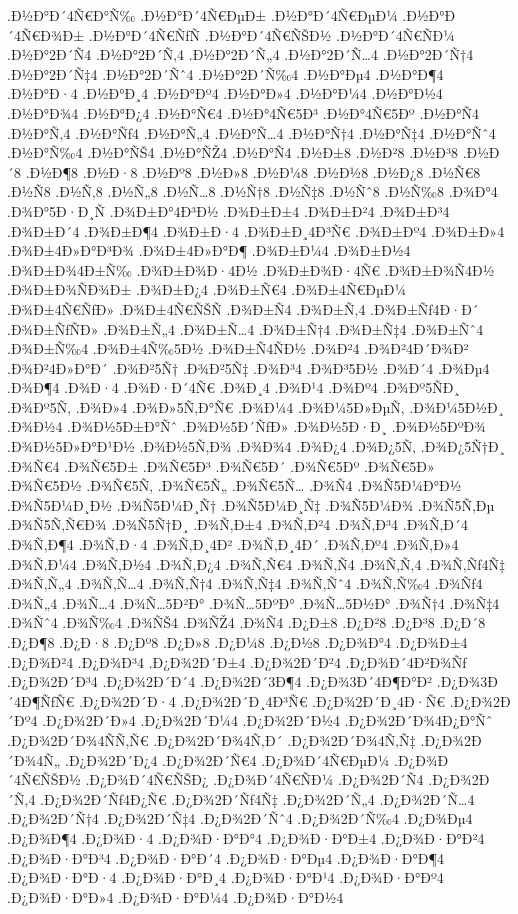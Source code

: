 {.Ð½Ð°Ð´4Ñ€Ð°Ñ‰
.Ð½Ð°Ð´4Ñ€ÐµÐ±
.Ð½Ð°Ð´4Ñ€ÐµÐ¼
.Ð½Ð°Ð´4Ñ€Ð¾Ð±
.Ð½Ð°Ð´4Ñ€ÑƒÑ
.Ð½Ð°Ð´4Ñ€ÑŠÐ½
.Ð½Ð°Ð´4Ñ€ÑÐ¼
.Ð½Ð°2Ð´Ñ4
.Ð½Ð°2Ð´Ñ‚4
.Ð½Ð°2Ð´Ñ„4
.Ð½Ð°2Ð´Ñ…4
.Ð½Ð°2Ð´Ñ†4
.Ð½Ð°2Ð´Ñ‡4
.Ð½Ð°2Ð´Ñˆ4
.Ð½Ð°2Ð´Ñ‰4
.Ð½Ð°Ðµ4
.Ð½Ð°Ð¶4
.Ð½Ð°Ð·4
.Ð½Ð°Ð¸4
.Ð½Ð°Ðº4
.Ð½Ð°Ð»4
.Ð½Ð°Ð¼4
.Ð½Ð°Ð½4
.Ð½Ð°Ð¾4
.Ð½Ð°Ð¿4
.Ð½Ð°Ñ€4
.Ð½Ð°4Ñ€5Ð³
.Ð½Ð°4Ñ€5Ðº
.Ð½Ð°Ñ4
.Ð½Ð°Ñ‚4
.Ð½Ð°Ñƒ4
.Ð½Ð°Ñ„4
.Ð½Ð°Ñ…4
.Ð½Ð°Ñ†4
.Ð½Ð°Ñ‡4
.Ð½Ð°Ñˆ4
.Ð½Ð°Ñ‰4
.Ð½Ð°ÑŠ4
.Ð½Ð°ÑŽ4
.Ð½Ð°Ñ4
.Ð½Ð±8
.Ð½Ð²8
.Ð½Ð³8
.Ð½Ð´8
.Ð½Ð¶8
.Ð½Ð·8
.Ð½Ðº8
.Ð½Ð»8
.Ð½Ð¼8
.Ð½Ð½8
.Ð½Ð¿8
.Ð½Ñ€8
.Ð½Ñ8
.Ð½Ñ‚8
.Ð½Ñ„8
.Ð½Ñ…8
.Ð½Ñ†8
.Ð½Ñ‡8
.Ð½Ñˆ8
.Ð½Ñ‰8
.Ð¾Ð°4
.Ð¾Ð°5Ð·Ð¸Ñ
.Ð¾Ð±Ð°4Ð³Ð½
.Ð¾Ð±Ð±4
.Ð¾Ð±Ð²4
.Ð¾Ð±Ð³4
.Ð¾Ð±Ð´4
.Ð¾Ð±Ð¶4
.Ð¾Ð±Ð·4
.Ð¾Ð±Ð¸4Ð³Ñ€
.Ð¾Ð±Ðº4
.Ð¾Ð±Ð»4
.Ð¾Ð±4Ð»Ð°Ð³Ð¾
.Ð¾Ð±4Ð»Ð°Ð¶
.Ð¾Ð±Ð¼4
.Ð¾Ð±Ð½4
.Ð¾Ð±Ð¾4Ð±Ñ‰
.Ð¾Ð±Ð¾Ð·4Ð½
.Ð¾Ð±Ð¾Ð·4Ñ€
.Ð¾Ð±Ð¾Ñ4Ð½
.Ð¾Ð±Ð¾ÑÐ¾Ð±
.Ð¾Ð±Ð¿4
.Ð¾Ð±Ñ€4
.Ð¾Ð±4Ñ€ÐµÐ¼
.Ð¾Ð±4Ñ€ÑƒÐ»
.Ð¾Ð±4Ñ€ÑŠÑ
.Ð¾Ð±Ñ4
.Ð¾Ð±Ñ‚4
.Ð¾Ð±Ñƒ4Ð·Ð´
.Ð¾Ð±ÑƒÑÐ»
.Ð¾Ð±Ñ„4
.Ð¾Ð±Ñ…4
.Ð¾Ð±Ñ†4
.Ð¾Ð±Ñ‡4
.Ð¾Ð±Ñˆ4
.Ð¾Ð±Ñ‰4
.Ð¾Ð±4Ñ‰5Ð½
.Ð¾Ð±Ñ4ÑÐ½
.Ð¾Ð²4
.Ð¾Ð²4Ð´Ð¾Ð²
.Ð¾Ð²4Ð»Ð°Ð´
.Ð¾Ð²5Ñ†
.Ð¾Ð²5Ñ‡
.Ð¾Ð³4
.Ð¾Ð³5Ð½
.Ð¾Ð´4
.Ð¾Ðµ4
.Ð¾Ð¶4
.Ð¾Ð·4
.Ð¾Ð·Ð´4Ñ€
.Ð¾Ð¸4
.Ð¾Ð¹4
.Ð¾Ðº4
.Ð¾Ðº5ÑÐ¸
.Ð¾Ðº5Ñ‚
.Ð¾Ð»4
.Ð¾Ð»5Ñ‚Ð°Ñ€
.Ð¾Ð¼4
.Ð¾Ð¼5Ð»ÐµÑ‚
.Ð¾Ð¼5Ð½Ð¸
.Ð¾Ð½4
.Ð¾Ð½5Ð±Ð°Ñˆ
.Ð¾Ð½5Ð´ÑƒÐ»
.Ð¾Ð½5Ð·Ð¸
.Ð¾Ð½5ÐºÐ¾
.Ð¾Ð½5Ð»Ð°Ð¹Ð½
.Ð¾Ð½5Ñ‚Ð¾
.Ð¾Ð¾4
.Ð¾Ð¿4
.Ð¾Ð¿5Ñ‚
.Ð¾Ð¿5Ñ†Ð¸
.Ð¾Ñ€4
.Ð¾Ñ€5Ð±
.Ð¾Ñ€5Ð³
.Ð¾Ñ€5Ð´
.Ð¾Ñ€5Ðº
.Ð¾Ñ€5Ð»
.Ð¾Ñ€5Ð½
.Ð¾Ñ€5Ñ‚
.Ð¾Ñ€5Ñ„
.Ð¾Ñ€5Ñ…
.Ð¾Ñ4
.Ð¾Ñ5Ð¼Ð°Ð½
.Ð¾Ñ5Ð¼Ð¸Ð½
.Ð¾Ñ5Ð¼Ð¸Ñ†
.Ð¾Ñ5Ð¼Ð¸Ñ‡
.Ð¾Ñ5Ð¼Ð¾
.Ð¾Ñ5Ñ‚Ðµ
.Ð¾Ñ5Ñ‚Ñ€Ð¾
.Ð¾Ñ5Ñ†Ð¸
.Ð¾Ñ‚Ð±4
.Ð¾Ñ‚Ð²4
.Ð¾Ñ‚Ð³4
.Ð¾Ñ‚Ð´4
.Ð¾Ñ‚Ð¶4
.Ð¾Ñ‚Ð·4
.Ð¾Ñ‚Ð¸4Ð²
.Ð¾Ñ‚Ð¸4Ð´
.Ð¾Ñ‚Ðº4
.Ð¾Ñ‚Ð»4
.Ð¾Ñ‚Ð¼4
.Ð¾Ñ‚Ð½4
.Ð¾Ñ‚Ð¿4
.Ð¾Ñ‚Ñ€4
.Ð¾Ñ‚Ñ4
.Ð¾Ñ‚Ñ‚4
.Ð¾Ñ‚Ñƒ4Ñ‡
.Ð¾Ñ‚Ñ„4
.Ð¾Ñ‚Ñ…4
.Ð¾Ñ‚Ñ†4
.Ð¾Ñ‚Ñ‡4
.Ð¾Ñ‚Ñˆ4
.Ð¾Ñ‚Ñ‰4
.Ð¾Ñƒ4
.Ð¾Ñ„4
.Ð¾Ñ…4
.Ð¾Ñ…5Ð²Ð°
.Ð¾Ñ…5ÐºÐ°
.Ð¾Ñ…5Ð½Ð°
.Ð¾Ñ†4
.Ð¾Ñ‡4
.Ð¾Ñˆ4
.Ð¾Ñ‰4
.Ð¾ÑŠ4
.Ð¾ÑŽ4
.Ð¾Ñ4
.Ð¿Ð±8
.Ð¿Ð²8
.Ð¿Ð³8
.Ð¿Ð´8
.Ð¿Ð¶8
.Ð¿Ð·8
.Ð¿Ðº8
.Ð¿Ð»8
.Ð¿Ð¼8
.Ð¿Ð½8
.Ð¿Ð¾Ð°4
.Ð¿Ð¾Ð±4
.Ð¿Ð¾Ð²4
.Ð¿Ð¾Ð³4
.Ð¿Ð¾2Ð´Ð±4
.Ð¿Ð¾2Ð´Ð²4
.Ð¿Ð¾Ð´4Ð²Ð¾Ñƒ
.Ð¿Ð¾2Ð´Ð³4
.Ð¿Ð¾2Ð´Ð´4
.Ð¿Ð¾2Ð´3Ð¶4
.Ð¿Ð¾3Ð´4Ð¶Ð°Ð²
.Ð¿Ð¾3Ð´4Ð¶ÑƒÑ€
.Ð¿Ð¾2Ð´Ð·4
.Ð¿Ð¾2Ð´Ð¸4Ð³Ñ€
.Ð¿Ð¾2Ð´Ð¸4Ð·Ñ€
.Ð¿Ð¾2Ð´Ðº4
.Ð¿Ð¾2Ð´Ð»4
.Ð¿Ð¾2Ð´Ð¼4
.Ð¿Ð¾2Ð´Ð½4
.Ð¿Ð¾2Ð´Ð¾4Ð¿Ð°Ñˆ
.Ð¿Ð¾2Ð´Ð¾4ÑÑ‚Ñ€
.Ð¿Ð¾2Ð´Ð¾4Ñ‚Ð´
.Ð¿Ð¾2Ð´Ð¾4Ñ‚Ñ‡
.Ð¿Ð¾2Ð´Ð¾4Ñ„
.Ð¿Ð¾2Ð´Ð¿4
.Ð¿Ð¾2Ð´Ñ€4
.Ð¿Ð¾Ð´4Ñ€ÐµÐ¼
.Ð¿Ð¾Ð´4Ñ€ÑŠÐ½
.Ð¿Ð¾Ð´4Ñ€ÑŠÐ¿
.Ð¿Ð¾Ð´4Ñ€ÑÐ¼
.Ð¿Ð¾2Ð´Ñ4
.Ð¿Ð¾2Ð´Ñ‚4
.Ð¿Ð¾2Ð´Ñƒ4Ð¿Ñ€
.Ð¿Ð¾2Ð´Ñƒ4Ñ‡
.Ð¿Ð¾2Ð´Ñ„4
.Ð¿Ð¾2Ð´Ñ…4
.Ð¿Ð¾2Ð´Ñ†4
.Ð¿Ð¾2Ð´Ñ‡4
.Ð¿Ð¾2Ð´Ñˆ4
.Ð¿Ð¾2Ð´Ñ‰4
.Ð¿Ð¾Ðµ4
.Ð¿Ð¾Ð¶4
.Ð¿Ð¾Ð·4
.Ð¿Ð¾Ð·Ð°Ð°4
.Ð¿Ð¾Ð·Ð°Ð±4
.Ð¿Ð¾Ð·Ð°Ð²4
.Ð¿Ð¾Ð·Ð°Ð³4
.Ð¿Ð¾Ð·Ð°Ð´4
.Ð¿Ð¾Ð·Ð°Ðµ4
.Ð¿Ð¾Ð·Ð°Ð¶4
.Ð¿Ð¾Ð·Ð°Ð·4
.Ð¿Ð¾Ð·Ð°Ð¸4
.Ð¿Ð¾Ð·Ð°Ð¹4
.Ð¿Ð¾Ð·Ð°Ðº4
.Ð¿Ð¾Ð·Ð°Ð»4
.Ð¿Ð¾Ð·Ð°Ð¼4
.Ð¿Ð¾Ð·Ð°Ð½4
}
